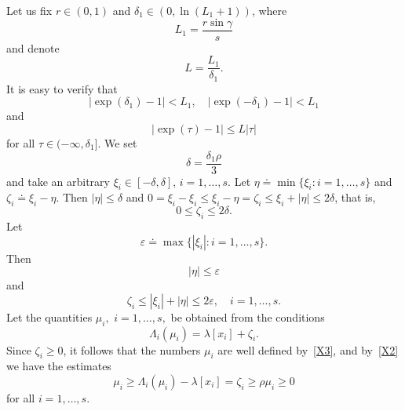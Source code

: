\documentclass[11pt]{article}
\begin{document}
Let us fix $r\in ( 0,1) $ and $\delta _{1}\in ( 0,\ln (
L_{1}+1) ) $, where%
\begin{equation*}
L_{1}=\frac{r\sin \gamma }{s}
\end{equation*}%
and denote%
\begin{equation*}
L=\frac{L_{1}}{\delta _{1}}.
\end{equation*}%
It is easy to verify that 
\begin{equation*}
\left| \exp ( \delta _{1}) -1\right| <L_{1},\quad
\left| \exp ( -\delta _{1}) -1\right| <L_{1}
\end{equation*}%
and 
\begin{equation*}
\left| \exp ( \tau ) -1\right| \le L\left| \tau
\right| 
\end{equation*}%
for all $\tau \in ( -\infty ,\delta _{1}] $. 
We set 
\begin{equation*}
\delta =\frac{\delta _{1}\rho }{3}
\end{equation*}%
and take an arbitrary $\xi_{i}\in [-\delta,\delta]$, $i=1,\dots,s$. 
Let $\eta\doteq\min\bigl\{\xi_i\colon i=1,\dots,s\bigr\}$ and $\zeta_i\doteq\xi_i-\eta$. Then
$|\eta|\le\delta$ and
$0=\xi_i-\xi_i\le\xi_i-\eta=\zeta_i\le\xi_i+|\eta|\le 2\delta$,
that is,
\begin{equation*}
0\le\zeta_i\le 2\delta.
\end{equation*}
Let
\begin{equation*}
\varepsilon \doteq\max \bigl\{|\xi_{i}| \colon i=1,\dots ,s\bigr\}.
\end{equation*}%
Then 
\begin{equation*}
|\eta| \le \varepsilon  
\label{X4}
\end{equation*}%
and%
\begin{equation*}
\zeta_i\le|\xi_i|+|\eta|\le 2\varepsilon,\quad i=1,\dots,s.   
\label{X5}
\end{equation*}%
Let the quantities $\mu _{i},$ $i=1,\dots ,s,$ be
obtained from the conditions 
\begin{equation*}
\Lambda _{i}(\mu _{i})=\lambda [ x_{i}] +\zeta _{i}.
\end{equation*}%
Since $\zeta_{i}\ge 0$, it follows that the numbers $\mu _{i}$ are well
defined by~\eqref{X3}, and by~\eqref{X2} we have the estimates 
\begin{equation*}
\mu _{i}\ge \Lambda _{i}(\mu _{i})-\lambda [ x_{i}] =\zeta_{i}\ge \rho \mu _{i}\ge 0
\end{equation*}%
for all $i=1,\dots ,s$.
\end{document}
